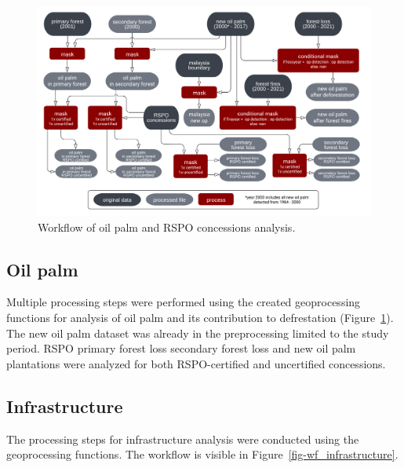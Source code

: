 \documentclass[
  letterpaper,
  DIV=11,
  numbers=noendperiod]{scrreprt}
\begin{document}
\begin{figure}[H]

{\centering \includegraphics{text/05_method_files/op_workflow.png}

}

\caption{\label{fig-wf_oilpalm}Workflow of oil palm and RSPO concessions
analysis.}

\end{figure}

\newpage

\hypertarget{oil-palm}{%
\subsection{Oil palm}\label{oil-palm}}

Multiple processing steps were performed using the created geoprocessing
functions for analysis of oil palm and its contribution to defrestation
(Figure~\ref{fig-wf_oilpalm}). The new oil palm dataset was already in
the preprocessing limited to the study period. RSPO primary forest loss
secondary forest loss and new oil palm plantations were analyzed for
both RSPO-certified and uncertified concessions.

\hypertarget{infrastructure}{%
\subsection{Infrastructure}\label{infrastructure}}

The processing steps for infrastructure analysis were conducted using
the geoprocessing functions. The workflow is visible in
Figure~\ref{fig-wf_infrastructure}.
\end{document}

